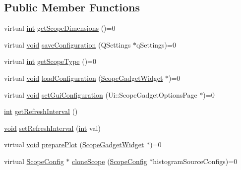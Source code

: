 \subsection*{Public Member Functions}
\begin{DoxyCompactItemize}
\item 
virtual \hyperlink{ioapi_8h_a787fa3cf048117ba7123753c1e74fcd6}{int} \hyperlink{group___scope_plugin_ga4eaff3a14398928e3ffba453ea199699}{get\-Scope\-Dimensions} ()=0
\item 
virtual \hyperlink{group___u_a_v_objects_plugin_ga444cf2ff3f0ecbe028adce838d373f5c}{void} \hyperlink{group___scope_plugin_gac41e7079a53acbf5fc4c32b59c120da2}{save\-Configuration} (Q\-Settings $\ast$q\-Settings)=0
\item 
virtual \hyperlink{ioapi_8h_a787fa3cf048117ba7123753c1e74fcd6}{int} \hyperlink{group___scope_plugin_gafdf4c997ec7b0c40644711b3578db610}{get\-Scope\-Type} ()=0
\item 
virtual \hyperlink{group___u_a_v_objects_plugin_ga444cf2ff3f0ecbe028adce838d373f5c}{void} \hyperlink{group___scope_plugin_gaea33bfb89c03afcf1f81969983ed926c}{load\-Configuration} (\hyperlink{class_scope_gadget_widget}{Scope\-Gadget\-Widget} $\ast$)=0
\item 
virtual \hyperlink{group___u_a_v_objects_plugin_ga444cf2ff3f0ecbe028adce838d373f5c}{void} \hyperlink{group___scope_plugin_ga322c46b28e707e71d7076f0e51cdc0b4}{set\-Gui\-Configuration} (Ui\-::\-Scope\-Gadget\-Options\-Page $\ast$)=0
\item 
\hyperlink{ioapi_8h_a787fa3cf048117ba7123753c1e74fcd6}{int} \hyperlink{group___scope_plugin_ga6886a1b5239454cd6525352914381382}{get\-Refresh\-Interval} ()
\item 
\hyperlink{group___u_a_v_objects_plugin_ga444cf2ff3f0ecbe028adce838d373f5c}{void} \hyperlink{group___scope_plugin_ga9d0e03a1430ff0f766ff51a3daafb2ee}{set\-Refresh\-Interval} (\hyperlink{ioapi_8h_a787fa3cf048117ba7123753c1e74fcd6}{int} val)
\item 
virtual \hyperlink{group___u_a_v_objects_plugin_ga444cf2ff3f0ecbe028adce838d373f5c}{void} \hyperlink{group___scope_plugin_gaacd609b338179da5902c1a644a4d9676}{prepare\-Plot} (\hyperlink{class_scope_gadget_widget}{Scope\-Gadget\-Widget} $\ast$)=0
\item 
virtual \hyperlink{class_scope_config}{Scope\-Config} $\ast$ \hyperlink{group___scope_plugin_ga550248228c701bfd0a35edf08ec94b1a}{clone\-Scope} (\hyperlink{class_scope_config}{Scope\-Config} $\ast$histogram\-Source\-Configs)=0
\end{DoxyCompactItemize}
